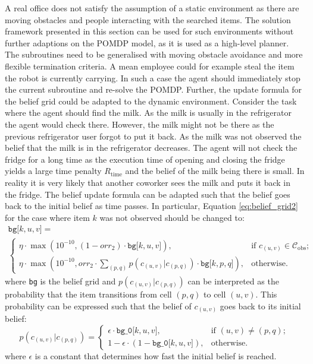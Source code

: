 A real office does not satisfy the assumption of a static environment as there are moving obstacles and people interacting with the searched items. 
The solution framework presented in this section can be used for such environments without further adaptions on the POMDP model, as it is used as a high-level planner. The subroutines need to be generalised with moving obstacle avoidance and more flexible termination criteria. A mean employee could for example steal the item the robot is currently carrying. In such a case the agent should immediately stop the current subroutine and re-solve the POMDP. Further, the update formula for the belief grid could be adapted to the dynamic environment. Consider the task where the agent should find the milk. As the milk is usually in the refrigerator the agent would check there. However, the milk might not be there as the previous refrigerator user forgot to put it back. As the milk was not observed the belief that the milk is in the refrigerator decreases. The agent will not check the fridge for a long time as the execution time of opening and closing the fridge yields a large time penalty $R_\text{time}$ and the belief of the milk being there is small. In reality it is very likely that another coworker sees the milk and puts it back in the fridge. The belief update formula can be adapted such that the belief goes back to the initial belief as time passes. In particular, Equation \ref{eq:belief_grid2} for the case where item $k$ was not observed should be changed to:
\begin{multline}
    \texttt{bg[$k, u, v$]} = \\
    \begin{cases} 
        \eta \cdot\max\left(10^{-10}, (1 -  orr_2) \cdot \texttt{bg[$k, u, v$]}\right), &\text{if }c_{(u,v)} \in \mathcal{C}_\text{obs};\\
        \eta \cdot \max\left(10^{-10}, orr_2 \cdot \sum_{(p,q)}p(c_{(u,v)}|c_{(p,q)}) \cdot \texttt{bg[$k, p, q$]}\right), &\text{otherwise}.
    \end{cases}
\end{multline}
where \texttt{bg} is the belief grid and $p(c_{(u,v)}|c_{(p,q)})$ can be interpreted as the probability that the item transitions from cell $(p,q)$ to cell $(u,v)$. This probability can be expressed such that the belief of $c_{(u,v)}$ goes back to its initial belief: 
\begin{equation}
    p(c_{(u,v)}|c_{(p,q)}) = \begin{cases}
    \epsilon \cdot \texttt{bg\_0[$k, u, v$]}, &\text{if } (u,v)\neq (p,q);\\
    1 - \epsilon \cdot (1-\texttt{bg\_0[$k, u, v$]}), &\text{otherwise}.
    \end{cases}
\end{equation}
where $\epsilon$ is a constant that determines how fast the initial belief is reached.\\

